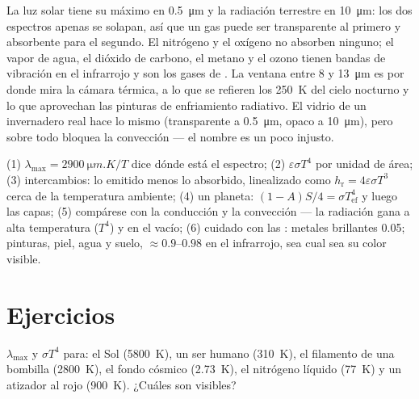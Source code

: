 \begin{remark}\label{rem:b2:thermal-radiation:selective}
La luz solar tiene su máximo en \qty{0.5}{\micro m} y la radiación terrestre en
\qty{10}{\micro m}: los dos espectros apenas se solapan, así que un gas puede ser
transparente al primero y absorbente para el segundo. El nitrógeno y el
oxígeno no absorben ninguno; el vapor de agua, el dióxido de carbono, el metano y el ozono
tienen bandas de vibración en el infrarrojo y son los gases de . La
ventana entre \qty{8}{} y \qty{13}{\micro m} es por donde mira la cámara térmica,
a lo que se refieren los \qty{250}{K} del cielo nocturno y lo que
aprovechan las pinturas de enfriamiento radiativo. El vidrio de un invernadero real hace
lo mismo (transparente a \qty{0.5}{\micro m}, opaco a \qty{10}{\micro m}),
pero sobre todo bloquea la convección --- el nombre es un poco injusto.
\end{remark}

\begin{method}\label{meth:b2:thermal-radiation:method}
(1) $\lambda_{\max} = \qty{2900}{\micro m.K}/T$ dice dónde está el espectro;
(2) $\varepsilon\sigma T^4$ por unidad de área; (3) intercambios: lo emitido
menos lo absorbido, linealizado como $h_{\text{r}} = 4\varepsilon\sigma T^3$ cerca de la
temperatura ambiente; (4) un planeta: $(1 - A)S/4 = \sigma T_{\text{ef}}^4$ y luego
las capas; (5) compárese con la conducción y la convección --- la radiación
gana a alta temperatura ($T^4$) y en el vacío; (6) cuidado con las :
metales brillantes \qty{0.05}{}; pinturas, piel, agua y suelo, $\approx 0.9$--$0.98$
en el infrarrojo, sea cual sea su color visible.
\end{method}

\section{Ejercicios}

\begin{exercise}[$\star$]\label{exo:b2:thermal-radiation:1}
$\lambda_{\max}$ y $\sigma T^4$ para: el Sol (\qty{5800}{K}), un ser humano
(\qty{310}{K}), el filamento de una bombilla (\qty{2800}{K}), el fondo cósmico
(\qty{2.73}{K}), el nitrógeno líquido (\qty{77}{K}) y un atizador al rojo
(\qty{900}{K}). ¿Cuáles son visibles?
\end{exercise}

